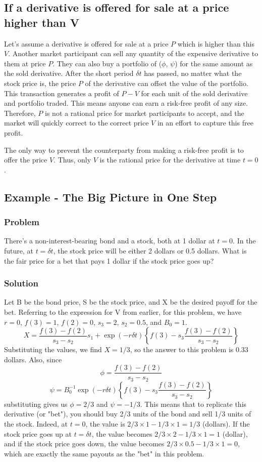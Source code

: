 \documentclass[uplatex,a4j,12pt,dvipdfmx]{jsarticle}
\begin{document}
\subsection{If a derivative is offered for sale at a price higher than V}
Let's assume a derivative is offered for sale at a price $P$ which is higher than this $V$. Another market participant can sell any quantity of the expensive derivative to them at price $P$. They can also buy a portfolio of ($\phi$, $\psi$) for the same amount as the sold derivative. After the short period $\delta t$ has passed, no matter what the stock price is, the price $P$ of the derivative can offset the value of the portfolio. This transaction generates a profit of $P-V$ for each unit of the sold derivative and portfolio traded. This means anyone can earn a risk-free profit of any size. Therefore, $P$ is not a rational price for market participants to accept, and the market will quickly correct to the correct price $V$ in an effort to capture this free profit.

The only way to prevent the counterparty from making a risk-free profit is to offer the price $V$. Thus, only $V$ is the rational price for the derivative at time $t=0$.

\subsection{Example - The Big Picture in One Step}
\subsubsection{Problem}
There's a non-interest-bearing bond and a stock, both at 1 dollar at $t=0$. In the future, at $t=\delta t$, the stock price will be either 2 dollars or 0.5 dollars. What is the fair price for a bet that pays 1 dollar if the stock price goes up?

\subsubsection{Solution}
Let B be the bond price, S be the stock price, and X be the desired payoff for the bet. Referring to the expression for V from earlier, for this problem, we have $r=0$, $f(3)=1$, $f(2)=0$, $s_3=2$, $s_2=0.5$, and $B_0=1$.
\[X = \frac{f(3) - f(2)}{s_3 - s_2} s_1 + \exp(-r\delta t) \left\{ f(3) - s_3 \frac{f(3) - f(2)}{s_3 - s_2} \right\}\]
Substituting the values, we find $X = 1/3$, so the answer to this problem is 0.33 dollars.
Also, since
\[\phi = \frac{f(3) - f(2)}{s_3 - s_2}\]
\[\psi = B_0^{-1} \exp(-r\delta t) \left\{ f(3) - s_3 \frac{f(3) - f(2)}{s_3 - s_2} \right\}\]
substituting gives us $\phi =2/3$ and $\psi=-1/3$. This means that to replicate this derivative (or "bet"), you should buy 2/3 units of the bond and sell 1/3 units of the stock. Indeed, at $t=0$, the value is $2/3 \times 1 - 1/3 \times 1 = 1/3$ (dollars). If the stock price goes up at $t=\delta t$, the value becomes $2/3 \times 2 - 1/3 \times 1 = 1$ (dollar), and if the stock price goes down, the value becomes $2/3 \times 0.5 - 1/3 \times 1 = 0$, which are exactly the same payouts as the "bet" in this problem.
\end{document}
